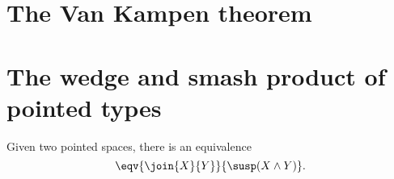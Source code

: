 \documentclass[11pt]{memoir} %
\begin{document}






\chapter{The Van Kampen theorem}

\chapter{The wedge and smash product of pointed types}

\begin{thm}
Given two pointed spaces, there is an equivalence
\begin{equation*}
\eqv{\join{X}{Y}}{\susp(X\wedge Y)}.
\end{equation*}
\end{thm}
\end{document}
